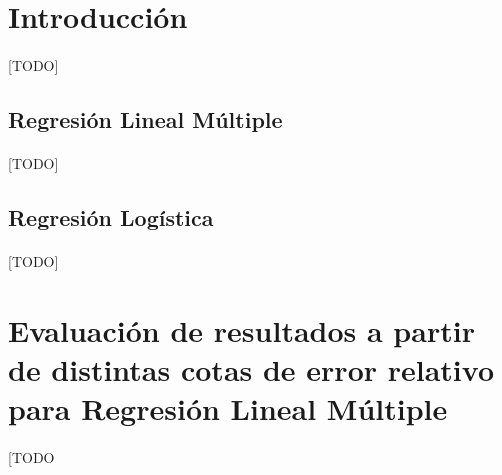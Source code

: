 \documentclass{article}
\begin{document}
	\maketitle %

	\thispagestyle{fancy} %



	\begin{abstract}
		\noindent [TODO ]
	\end{abstract}



	\section{Introducción}
	\label{sec:introducción}

		\paragraph{}
		[TODO]

		\subsection{Regresión Lineal Múltiple}

			\paragraph{}
			[TODO]

		\subsection{Regresión Logística}

			\paragraph{}
			[TODO]


	\section{Evaluación de resultados a partir de distintas cotas de error relativo para Regresión Lineal Múltiple}
	\label{sec:e1}

		\paragraph{}
		[TODO
\end{document}
